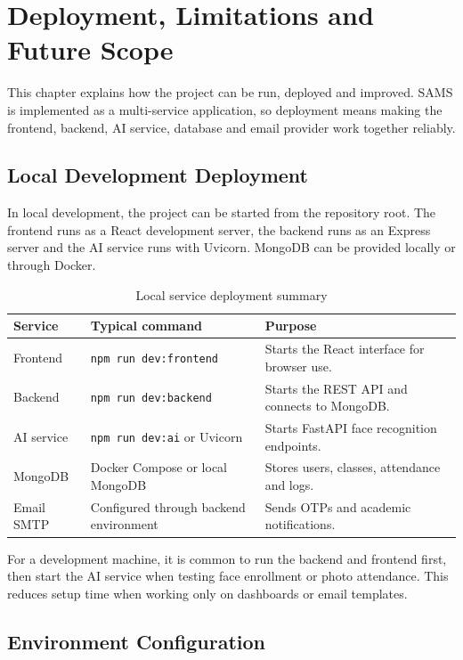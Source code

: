 \chapter{Deployment, Limitations and Future Scope}
\label{chap:deployment}

This chapter explains how the project can be run, deployed and improved. SAMS is implemented as a multi-service application, so deployment means making the frontend, backend, AI service, database and email provider work together reliably.

\section{Local Development Deployment}

In local development, the project can be started from the repository root. The frontend runs as a React development server, the backend runs as an Express server and the AI service runs with Uvicorn. MongoDB can be provided locally or through Docker.

\begin{table}[H]
\centering
\caption{Local service deployment summary}
\label{tab:local-deployment}
\begin{tabularx}{\textwidth}{p{3cm} p{4cm} X}
\toprule
\textbf{Service} & \textbf{Typical command} & \textbf{Purpose}\\
\midrule
Frontend & \texttt{npm run dev:frontend} & Starts the React interface for browser use.\\
Backend & \texttt{npm run dev:backend} & Starts the REST API and connects to MongoDB.\\
AI service & \texttt{npm run dev:ai} or Uvicorn & Starts FastAPI face recognition endpoints.\\
MongoDB & Docker Compose or local MongoDB & Stores users, classes, attendance and logs.\\
Email SMTP & Configured through backend environment & Sends OTPs and academic notifications.\\
\bottomrule
\end{tabularx}
\end{table}

For a development machine, it is common to run the backend and frontend first, then start the AI service when testing face enrollment or photo attendance. This reduces setup time when working only on dashboards or email templates.

\section{Environment Configuration}

